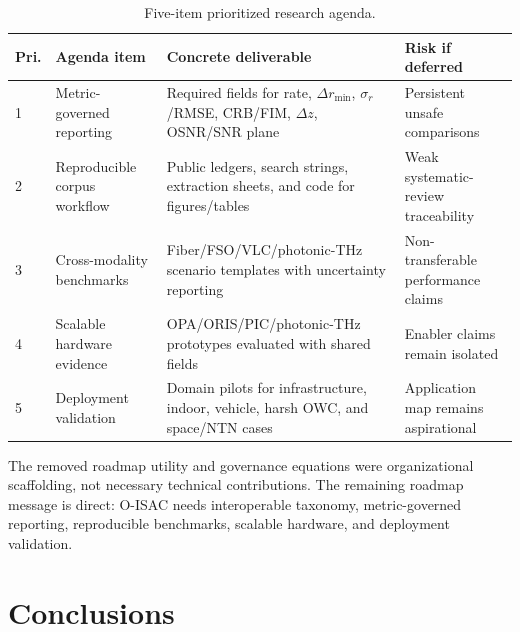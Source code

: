 \documentclass[letterpaper,journal]{IEEEtran}
\begin{document}
\begin{table}[!t]
    \caption{Five-item prioritized research agenda.}
    \label{tab:viii_f_2}
    \centering
    \scriptsize
    \setlength{\tabcolsep}{2.8pt}
    \renewcommand{\arraystretch}{1.08}
    \begin{tabularx}{\textwidth}{@{}p{0.55cm}p{2.7cm}X p{2.15cm}@{}}
        \toprule
        Pri. & Agenda item & Concrete deliverable & Risk if deferred \\
        \midrule
        1 & Metric-governed reporting & Required fields for rate, $\Delta r_{\min}$, $\sigma_r$/RMSE, CRB/FIM, $\Delta z$, OSNR/SNR plane & Persistent unsafe comparisons \\
        2 & Reproducible corpus workflow & Public ledgers, search strings, extraction sheets, and code for figures/tables & Weak systematic-review traceability \\
        3 & Cross-modality benchmarks & Fiber/FSO/VLC/photonic-THz scenario templates with uncertainty reporting & Non-transferable performance claims \\
        4 & Scalable hardware evidence & OPA/ORIS/PIC/photonic-THz prototypes evaluated with shared fields & Enabler claims remain isolated \\
        5 & Deployment validation & Domain pilots for infrastructure, indoor, vehicle, harsh OWC, and space/NTN cases & Application map remains aspirational \\
        \bottomrule
    \end{tabularx}
\end{table}

The removed roadmap utility and governance equations were organizational scaffolding, not necessary technical contributions. The remaining roadmap message is direct: O-ISAC needs interoperable taxonomy, metric-governed reporting, reproducible benchmarks, scalable hardware, and deployment validation.

\section{Conclusions}
\label{sec:conclusion}
\end{document}
